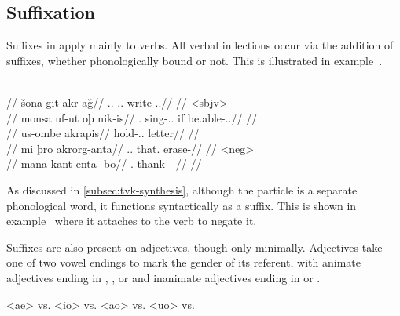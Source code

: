 \subsection{Suffixation}
\label{subsec:tvk-suffixation}

Suffixes in \langtvk{} apply mainly to verbs. All verbal inflections occur via the addition of suffixes, whether phonologically bound or not. This is illustrated in example~.

	\begingl
		\glpreamble{}\\
		//
		\gla šona git akr-aǧ//
		\glb \Tpp.\An.\Top{} \Tps.\In.\Acc{} write-\Ind.\Pst.\Rtsp//
		\glft{}//
	\endgl
	\a<sbjv>\begingl
		\glpreamble{}\\
		//
		\gla monsa uf-ut oþ nik-is//
		\glb \Fpc.\Top{} sing-\Ind.\Npst.\Pfv{} if be.able-\Sbjv.\Npst.\Ipfv//
		\glft{}//
	\endgl
	\a<iii:pptcp>\begingl
		\glpreamble{}\\
		//
		\gla us-ombe akrapis//
		\glb hold-\Pass.\Ptcp.\In{} letter//
		\glft{}//
	\endgl
	\a<i:imp>\begingl
		\glpreamble{}\\
		//
		\gla mi þro akrorg-anta//
		\glb \In.\Sg.\Top{} that.\Med{} erase-\Imp//
		\glft{}//
	\endgl
	\a<neg>\begingl
		\glpreamble{}\\
		//
		\gla mana kant-enta -bo//
		\glb \Fpp.\Top{} thank-\Imp{} -\Neg//
		\glft{}//
	\endgl
\xe

As discussed in \autoref{subsec:tvk-synthesis}, although the particle  is a separate phonological word, it functions syntactically as a suffix. This is shown in example~ where it attaches to the verb  to negate it.

Suffixes are also present on adjectives, though only minimally. Adjectives take one of two vowel endings to mark the gender of its referent, with animate adjectives ending in , , or  and inanimate adjectives ending in  or .

	\a<ae>  \gloss{\An} vs.   \gloss{\In} 
	\a<io>  \gloss{\An} vs.   \gloss{\In} 
	\a<ao>  \gloss{\An} vs.   \gloss{\In} 
	\a<uo>  \gloss{\An} vs.   \gloss{\In} 
\xe

